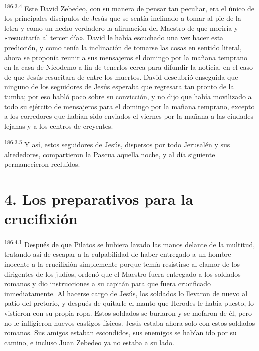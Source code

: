 \par 
\textsuperscript{186:3.4} Este David Zebedeo, con su manera de pensar tan peculiar, era el único de los principales discípulos de Jesús que se sentía inclinado a tomar al pie de la letra y como un hecho verdadero la afirmación del Maestro de que moriría y «resucitaría al tercer día». David le había escuchado una vez hacer esta predicción, y como tenía la inclinación de tomarse las cosas en sentido literal, ahora se proponía reunir a sus mensajeros el domingo por la mañana temprano en la casa de Nicodemo a fin de tenerlos cerca para difundir la noticia, en el caso de que Jesús resucitara de entre los muertos. David descubrió enseguida que ninguno de los seguidores de Jesús esperaba que regresara tan pronto de la tumba; por eso habló poco sobre su convicción, y no dijo que había movilizado a todo su ejército de mensajeros para el domingo por la mañana temprano, excepto a los corredores que habían sido enviados el viernes por la mañana a las ciudades lejanas y a los centros de creyentes.

\par 
\textsuperscript{186:3.5} Y así, estos seguidores de Jesús, dispersos por todo Jerusalén y sus alrededores, compartieron la Pascua aquella noche, y al día siguiente permanecieron recluídos.

\section*{4. Los preparativos para la crucifixión}
\par 
\textsuperscript{186:4.1} Después de que Pilatos se hubiera lavado las manos delante de la multitud, tratando así de escapar a la culpabilidad de haber entregado a un hombre inocente a la crucifixión simplemente porque temía resistirse al clamor de los dirigentes de los judíos, ordenó que el Maestro fuera entregado a los soldados romanos y dio instrucciones a su capitán para que fuera crucificado inmediatamente. Al hacerse cargo de Jesús, los soldados lo llevaron de nuevo al patio del pretorio, y después de quitarle el manto que Herodes le había puesto, lo vistieron con su propia ropa. Estos soldados se burlaron y se mofaron de él, pero no le infligieron nuevos castigos físicos. Jesús estaba ahora solo con estos soldados romanos. Sus amigos estaban escondidos, sus enemigos se habían ido por su camino, e incluso Juan Zebedeo ya no estaba a su lado.

